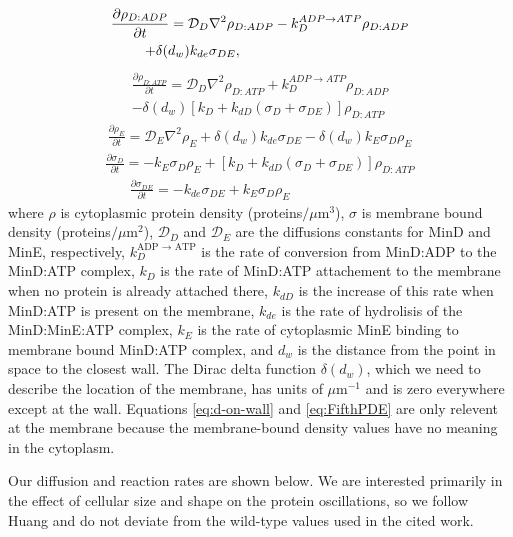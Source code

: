 \documentclass{pnastwo}
\newcommand\micron{\ensuremath{\mu\text{m}}}
\begin{document}
\begin{article}
\begin{multline}
  \frac{\partial \rho_{D:ADP}}{\partial t} = \mathcal{D}_D\nabla^2\rho_{D:ADP}-k_D^{ADP\rightarrow ATP}\rho_{D:ADP}\\
  +\delta(d_w)k_{de}\sigma_{DE},\hspace{3.4cm}
\end{multline}
\begin{multline}
  \frac{\partial \rho_{D:ATP}}{\partial t} = \mathcal{D}_D\nabla^2\rho_{D:ATP}+k_D^{ADP\rightarrow ATP}\rho_{D:ADP}\\
  -\delta(d_w)[k_D+k_{dD}(\sigma_D+\sigma_{DE})]\rho_{D:ATP}
\end{multline}
\begin{multline}
  \frac{\partial \rho_E}{\partial t} = \mathcal{D}_E\nabla^2\rho_E+\delta(d_w)k_{de}\sigma_{DE}
  -\delta(d_w)k_E \sigma_D \rho_E
\end{multline}
\begin{multline}
  \frac{\partial \sigma_D}{\partial t} = -k_E\sigma_D\rho_E
  +[k_D+k_{dD}(\sigma_D+\sigma_{DE})]\rho_{D:ATP}
  \label{eq:d-on-wall}
\end{multline}
\begin{multline}
  \frac{\partial \sigma_{DE}}{\partial t} = -k_{de}\sigma_{DE}+k_E\sigma_D\rho_E\hspace{3cm}
  \label{eq:FifthPDE}
\end{multline}
where $\rho$ is cytoplasmic protein density (proteins$/\micron^{3}$), $\sigma$
is membrane bound density (proteins$/\micron^{2}$), $\mathcal{D}_D$ and
$\mathcal{D}_{E}$ are the diffusions constants for MinD and MinE,
respectively, $k_D^{\textrm{ADP $\rightarrow$ ATP}}$ is the rate of
conversion from MinD:ADP to the MinD:ATP complex, $k_D$ is the rate of
MinD:ATP attachement to the membrane when no protein is already
attached there, $k_{dD}$ is the increase of this rate when MinD:ATP is
present on the membrane, $k_{de}$ is the rate of hydrolisis of the
MinD:MinE:ATP complex, $k_E$ is the rate of cytoplasmic MinE binding
to membrane bound MinD:ATP complex, and $d_w$ is the distance from the
point in space to the closest wall.  The Dirac delta function
$\delta(d_w)$, which we need to describe the location of the membrane,
has units of $\micron^{-1}$ and is zero everywhere except at the wall.
Equations \ref{eq:d-on-wall} and \ref{eq:FifthPDE} are only relevent
at the membrane because the membrane-bound density values have no
meaning in the cytoplasm.

Our diffusion and reaction rates are shown below.  We are interested
primarily in the effect of cellular size and shape on the protein
oscillations, so we follow Huang\cite{huang2003dynamic} and do not
deviate from the wild-type values used in the cited work.


\end{article}
\end{document}
